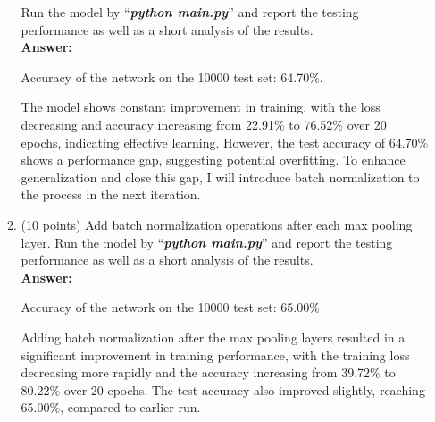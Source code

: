 \documentclass[11pt]{article}
\begin{document}
\begin{enumerate}
\begin{enumerate}
    Run the model by ``\emph{\textbf{python main.py}}'' and
    report the testing performance as well as a short analysis of
    the results.\\

    \textbf{Answer:}

    Accuracy of the network on the 10000 test set: 64.70\%.
    
    The model shows constant improvement in training, with the loss decreasing and accuracy increasing from 22.91\% to 76.52\% over 20 epochs, indicating effective learning. However, the test accuracy of 64.70\% shows a performance gap, suggesting potential overfitting. To enhance generalization and close this gap, I will introduce batch normalization to the process in the next iteration.

    


    \item (10 points) Add batch normalization operations after
    each max pooling layer. Run the model by
    ``\emph{\textbf{python main.py}}'' and report the testing performance as well as a short analysis of the results.\\

    \textbf{Answer:}

    Accuracy of the network on the 10000 test set: 65.00\%
    
    Adding batch normalization after the max pooling layers resulted in a significant improvement in training performance, with the training loss decreasing more rapidly and the accuracy increasing from 39.72\% to 80.22\% over 20 epochs. The test accuracy also improved slightly, reaching 65.00\%, compared to earlier run. 
    
    \end{enumerate}
    
    \end{enumerate}
\end{document}
